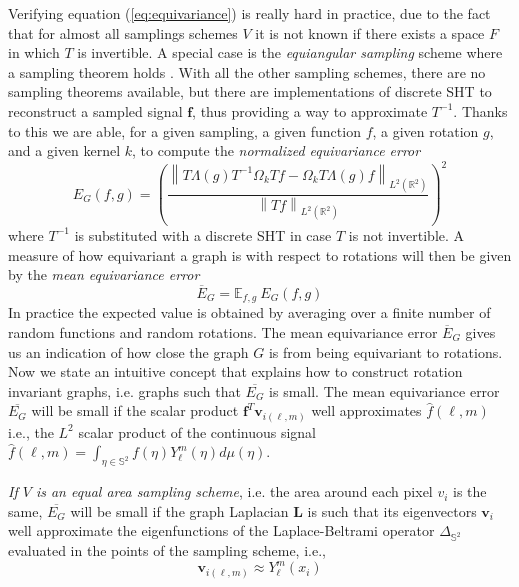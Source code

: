 \documentclass{article} %
\newcommand{\norm}[1]{\left\lVert#1\right\rVert}
\begin{document}
Verifying equation (\ref{eq:equivariance}) is really hard in practice, due to the fact that for almost all samplings schemes $V$ it is not known if there exists a space $F$ in which $T$ is invertible. A special case is the \textit{equiangular sampling} scheme where a sampling theorem holds \cite{Driscoll:1994:CFT:184069.184073}. With all the other sampling schemes, there are no sampling theorems available, but there are implementations of discrete SHT to reconstruct a sampled signal $\mathbf f$, thus providing a way to approximate $T^{-1}$. Thanks to this we are able, for a given sampling, a given function $f$, a given rotation $g$, and a given kernel $k$, to compute the \textit{normalized equivariance error} 
\begin{equation}\label{eq:equivariance error}
E_{G}(f, g) = \left(\frac{ \norm {T \Lambda(g) T^{-1} \Omega_k Tf - \Omega_k T \Lambda(g) f}_{L^2(\mathbb R^2)}}{\norm {Tf}_{L^2(\mathbb R^2)}}\right)^2
\end{equation}
where $T^{-1}$ is substituted with a discrete SHT in case $T$ is not invertible.
A measure of how equivariant a graph is with respect to rotations will then be given by the \textit{mean equivariance error}
\begin{equation}\label{eq:mean equivariance error}
\overline E_G = \mathbb E_{f, g}\ 	E_G(f, g) 
\end{equation}
In practice the expected value is obtained by averaging over a finite number of random functions and random rotations. The mean equivariance error $\overline E_G$ gives us an indication of how close the graph $G$ is from being equivariant to rotations. Now we state an intuitive concept that explains how to construct rotation invariant graphs, i.e. graphs such that $\overline{E_G}$ is small.
The mean equivariance error $\overline{E_G}$ will be small if the scalar product $\mathbf f^T \mathbf v_{i(\ell, m)}$ well approximates $\hat {f}(\ell,m)$ i.e., the $L^2$ scalar product of the continuous signal \\
	$\hat {f}(\ell,m)= \int_{\eta \in \mathbb S^2}f(\eta)Y_\ell^m(\eta)d\mu(\eta)$.
	
	\textit{If $V$ is an equal area sampling scheme}, i.e. the area around each pixel $v_i$ is the same, $\overline{E_G}$ will be small if the graph Laplacian $\mathbf L$ is such that its eigenvectors $\mathbf v_i$ well approximate the eigenfunctions of the Laplace-Beltrami operator $\Delta_{\mathbb S^2}$ evaluated in the points of the sampling scheme, i.e., 
	$$
	\mathbf v_{i(\ell, m)} \approx Y_\ell^m(x_i)
	$$
\end{document}
